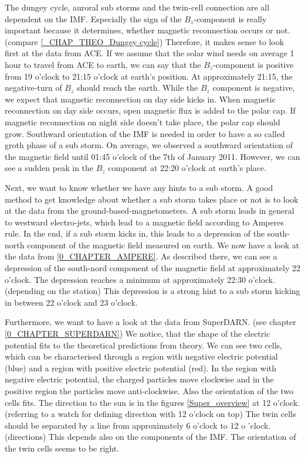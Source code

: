 \documentclass[10pt,a4paper]{article}
\begin{document}
The dungey cycle, auroral sub storms and the twin-cell connection are all dependent on the IMF. Especially the sign of the $B_z$-component is really important because it determines, whether magnetic reconnection occurs or not. (compare \ref{_CHAP_THEO_Dungey cycle}) Therefore, it makes sense to look first at the data from ACE. If we assume that the solar wind needs on average 1 hour to travel from ACE to earth, we can say that the $B_z$-component is positive from 19 o'clock to 21:15 o'clock at earth's position. At approximately 21:15, the negative-turn of $B_z$ should reach the earth. 
While the $B_z$ component is negative, we expect that magnetic reconnection on day side kicks in. When magnetic reconnection on day side occurs, open magnetic flux is added to the polar cap. If magnetic reconnection on night side doesn't take place, the polar cap should grow. 
Southward orientation of the IMF is needed in order to have a so called groth phase of a sub storm. 
On average, we observed a southward orientation of the magnetic field until 01:45 o'clock of the 7th of January 2011. However, we can see a sudden peak in the $B_z$ component at 22:20 o'clock at earth's place. 

Next, we want to know whether we have any hints to a sub storm. A good method to get knowledge about whether a sub storm takes place or not is to look at the data from the ground-based-magnetometers. A sub storm leads in general to westward electro-jets, which lead to a magnetic field according to Amperes rule. In the end, if a sub storm kicks in, this leads to a depression of the south-north component of the magnetic field measured on earth. 
We now have a look at the data from \ref{0_CHAPTER_AMPERE}. As described there, we can see a depression of the south-nord component of the magnetic field at approximately 22 o'clock. The depression reaches a minimum at approximately 22:30 o'clock. (depending on the station) This depression is a strong hint to a sub storm kicking in between 22 o'clock and 23 o'clock.

Furthermore, we want to have a look at the data from SuperDARN. (see chapter \ref{0_CHAPTER_SUPERDARN})
We notice, that the shape of the electric potential fits to the theoretical predictions from theory. We can see two cells, which can be characterised through a region with negative electric potential (blue) and a region with positive electric potential (red). In the region with negative electric potential, the charged particles move clockwise and in the positive region the particles move anti-clockwise. 
Also the orientation of the two cells fits. The direction to the sun is in the figures \ref{Super_overview} at 12 o'clock. (referring to a watch for defining direction with 12 o'clock on top) The twin cells should be separated by a line from approximately 6 o'clock to 12 o 'clock.(directions) This depends also on the components of the IMF. The orientation of the twin cells seems to be right.  
\end{document}
